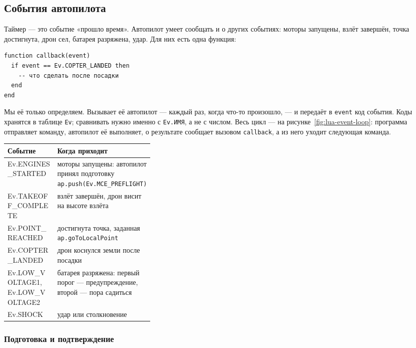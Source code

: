 \subsection{События автопилота}

Таймер --- это событие «прошло время». Автопилот умеет сообщать и о других событиях: моторы запущены, взлёт завершён, точка достигнута, дрон сел, батарея разряжена, удар. Для них есть одна функция:

\begin{codebox}
\begin{verbatim}
function callback(event)
  if event == Ev.COPTER_LANDED then
    -- что сделать после посадки
  end
end
\end{verbatim}
\end{codebox}

Мы её только определяем. Вызывает её автопилот --- каждый раз, когда что-то произошло, --- и передаёт в \verb|event| код события. Коды хранятся в таблице \verb|Ev|; сравнивать нужно именно с \verb|Ev.ИМЯ|, а не с числом. Весь цикл --- на рисунке~\ref{fig:lua-event-loop}: программа отправляет команду, автопилот её выполняет, о результате сообщает вызовом \verb|callback|, а из него уходит следующая команда.



\begin{center}
\small
\begin{tabularx}{\linewidth}{@{}>{\ttfamily\raggedright\arraybackslash}p{0.34\linewidth} X@{}}
\toprule
\normalfont\textbf{Событие} & \textbf{Когда приходит} \\
\midrule
Ev.ENGINES\_STARTED & моторы запущены: автопилот принял подготовку \texttt{ap.push(Ev.MCE\_PREFLIGHT)} \\
Ev.TAKEOFF\_COMPLETE & взлёт завершён, дрон висит на высоте взлёта \\
Ev.POINT\_REACHED & достигнута точка, заданная \texttt{ap.goToLocalPoint} \\
Ev.COPTER\_LANDED & дрон коснулся земли после посадки \\
Ev.LOW\_VOLTAGE1, Ev.LOW\_VOLTAGE2 & батарея разряжена: первый порог --- предупреждение, второй --- пора садиться \\
Ev.SHOCK & удар или столкновение \\
\bottomrule
\end{tabularx}
\end{center}

\subsubsection*{Подготовка и подтверждение}

